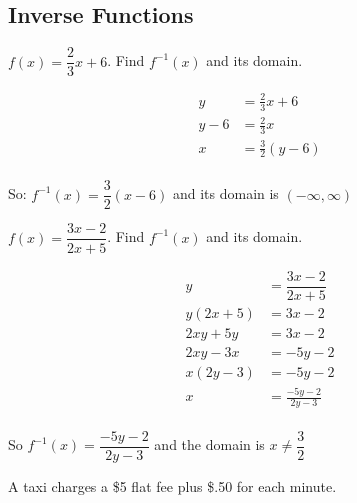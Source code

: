 \documentclass[fleqn,addpoints]{exam}
\begin{document}
\begin{questions}
\section{Inverse Functions}

\question[5] $f(x) = \dfrac{2}{3}x + 6$.  Find $f^{-1}(x)$ and its domain.
\label{inverse:first}
\begin{solution}[4 cm]
\begin{align*}
  y &= \frac{2}{3}x + 6 \\
  y - 6 &= \frac{2}{3}x \\
  x &= \frac{3}{2}(y - 6) \\
\end{align*}

So: $f^{-1}(x) = \dfrac{3}{2}(x - 6)$ and its domain is $(-\infty, \infty)$

\end{solution}

\question[7] $f(x) = \dfrac{3x-2}{2x+5}$.  Find $f^{-1}(x)$ and its domain.
\label{inverse:last}
\begin{solution}[3 cm]
\begin{align*}
  y &= \dfrac{3x-2}{2x+5} \\
  y(2x+5) &= 3x-2 \\
  2xy+5y &= 3x-2 \\
  2xy-3x &= -5y-2 \\
  x(2y-3) &= -5y-2 \\
  x &= \frac{-5y-2}{2y-3} \\
\end{align*}

So $f^{-1}(x) = \dfrac{-5y-2}{2y-3}$ and the domain is $x \neq \dfrac{3}{2}$
\end{solution}

\question
A taxi charges a \$5 flat fee plus \$.50 for each minute.

\end{questions}
\end{document}
